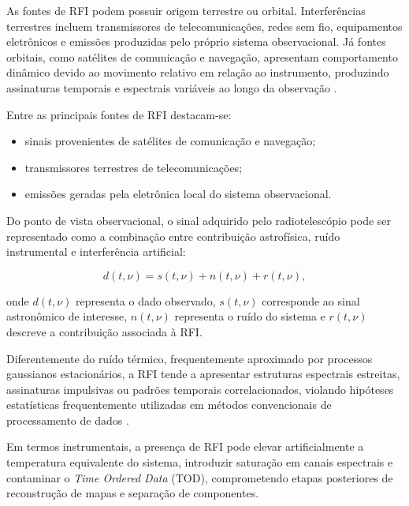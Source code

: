 As fontes de RFI podem possuir origem terrestre ou orbital. Interferências terrestres incluem transmissores de telecomunicações, redes sem fio, equipamentos eletrônicos e emissões produzidas pelo próprio sistema observacional. Já fontes orbitais, como satélites de comunicação e navegação, apresentam comportamento dinâmico devido ao movimento relativo em relação ao instrumento, produzindo assinaturas temporais e espectrais variáveis ao longo da observação \cite{harper2018potential}.

Entre as principais fontes de RFI destacam-se:

\begin{itemize}

\item sinais provenientes de satélites de comunicação e navegação;

\item transmissores terrestres de telecomunicações;

\item emissões geradas pela eletrônica local do sistema observacional.

\end{itemize}

Do ponto de vista observacional, o sinal adquirido pelo radiotelescópio pode ser representado como a combinação entre contribuição astrofísica, ruído instrumental e interferência artificial:

\begin{equation}
d(t,\nu)
=
s(t,\nu)
+
n(t,\nu)
+
r(t,\nu),
\end{equation}

onde \(d(t,\nu)\) representa o dado observado, \(s(t,\nu)\) corresponde ao sinal astronômico de interesse, \(n(t,\nu)\) representa o ruído do sistema e \(r(t,\nu)\) descreve a contribuição associada à RFI.

Diferentemente do ruído térmico, frequentemente aproximado por processos gaussianos estacionários, a RFI tende a apresentar estruturas espectrais estreitas, assinaturas impulsivas ou padrões temporais correlacionados, violando hipóteses estatísticas frequentemente utilizadas em métodos convencionais de processamento de dados \cite{ford_buch_2014_rfi}.

Em termos instrumentais, a presença de RFI pode elevar artificialmente a temperatura equivalente do sistema, introduzir saturação em canais espectrais e contaminar o \textit{Time Ordered Data} (TOD), comprometendo etapas posteriores de reconstrução de mapas e separação de componentes.

